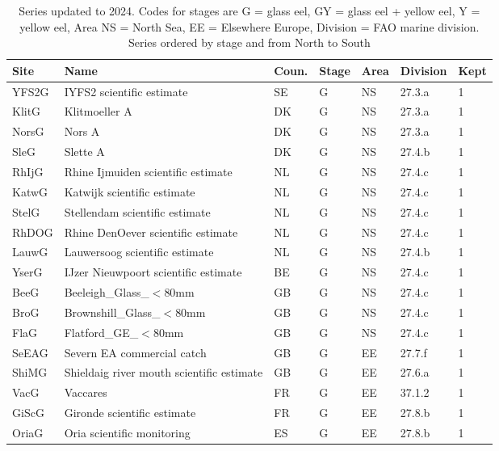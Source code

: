 \begin{table}[htbp]
\centering
\caption{Series updated to 2024. Codes for stages are G = glass eel, GY = glass eel + yellow eel, Y = yellow eel, Area NS = North Sea, EE = Elsewhere Europe, Division = FAO marine division. Series ordered by stage and from North to South} 
\label{table_seriesCY}
\begin{tabularx}{\textwidth}{p{1.3cm}p{6.5cm}p{1cm}p{1cm}p{1cm}p{1cm}p{1.4cm}}
  \hline
Site & Name & Coun. & Stage & Area & Division & Kept \\ 
  \hline
YFS2G & IYFS2 scientific estimate & SE & G & NS & 27.3.a &   1 \\ 
  KlitG & Klitmoeller A & DK & G & NS & 27.3.a &   1 \\ 
  NorsG & Nors A & DK & G & NS & 27.3.a &   1 \\ 
  SleG & Slette A & DK & G & NS & 27.4.b &   1 \\ 
  RhIjG & Rhine Ijmuiden scientific estimate & NL & G & NS & 27.4.c &   1 \\ 
  KatwG & Katwijk scientific estimate & NL & G & NS & 27.4.c &   1 \\ 
  StelG & Stellendam scientific estimate & NL & G & NS & 27.4.c &   1 \\ 
  RhDOG & Rhine DenOever scientific estimate & NL & G & NS & 27.4.c &   1 \\ 
  LauwG & Lauwersoog scientific estimate & NL & G & NS & 27.4.b &   1 \\ 
  YserG & IJzer Nieuwpoort scientific estimate & BE & G & NS & 27.4.c &   1 \\ 
  BeeG & Beeleigh\_Glass\_$<$80mm & GB & G & NS & 27.4.c &   1 \\ 
  BroG & Brownshill\_Glass\_$<$80mm & GB & G & NS & 27.4.c &   1 \\ 
  FlaG & Flatford\_GE\_$<$80mm & GB & G & NS & 27.4.c &   1 \\ 
  SeEAG & Severn EA commercial catch & GB & G & EE & 27.7.f &   1 \\ 
  ShiMG & Shieldaig river mouth scientific estimate & GB & G & EE & 27.6.a &   1 \\ 
  VacG & Vaccares & FR & G & EE & 37.1.2 &   1 \\ 
  GiScG & Gironde scientific estimate & FR & G & EE & 27.8.b &   1 \\ 
  OriaG & Oria scientific monitoring & ES & G & EE & 27.8.b &   1 \\ 

\end{tabularx}
\end{table}
